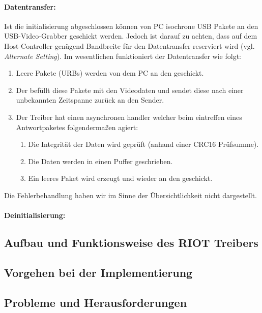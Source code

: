 \paragraph{Datentransfer:} Ist die initialisierung abgeschlossen können von PC isochrone USB Pakete an den USB-Video-Grabber
geschickt werden. Jedoch ist darauf zu achten, dass auf dem Host-Controller genügend Bandbreite für den Datentransfer reserviert wird
(vgl. \emph{Alternate Setting}). Im wesentlichen funktioniert der Datentransfer wie folgt:
\begin{enumerate}
 \item Leere Pakete (URBs) werden von dem PC an den \stk{} geschickt.
 \item Der \stk{} befüllt diese Pakete mit den Videodaten und sendet diese nach einer unbekannten Zeitspanne zurück an den Sender.
 \item Der Treiber hat einen asynchronen handler welcher beim eintreffen eines Antwortpaketes folgendermaßen agiert:
 \begin{enumerate}
  \item Die Integrität der Daten wird geprüft (anhand einer CRC16 Prüfsumme).
  \item Die Daten werden in einen Puffer geschrieben.
  \item Ein leeres Paket wird erzeugt und wieder an den \stk{} geschickt. 
 \end{enumerate}
\end{enumerate}
Die Fehlerbehandlung haben wir im Sinne der Übersichtlichkeit nicht dargestellt.

\paragraph{Deinitialisierung:}

\subsection{Aufbau und Funktionsweise des RIOT Treibers}


\subsection{Vorgehen bei der Implementierung}

\subsection{Probleme und Herausforderungen}

